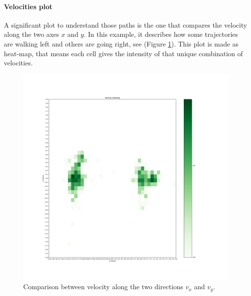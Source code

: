 \documentclass[class=article, crop=false]{standalone}
\begin{document}

\FloatBarrier

\paragraph{Velocities plot}
A significant plot to understand those paths is the one that compares the velocity along the two axes $x$ and $y$.
In this example, it describes how some trajectories are walking left and others are going right, see (Figure \ref{fig:5pids_velhist}).
This plot is made as heat-map, that means each cell gives the intensity of that unique combination of velocities.
\begin{figure}[h]
\centering
\includegraphics[scale=0.18]{fig/5pids/figure_trainf10_few_trajectories_Dx200_Dy100_VELHIST}
\captionsetup{width=.5\linewidth}
\caption{Comparison between velocity along the two directions $v_x$ and $v_y$.}
\label{fig:5pids_velhist}
\end{figure}
\end{document}
